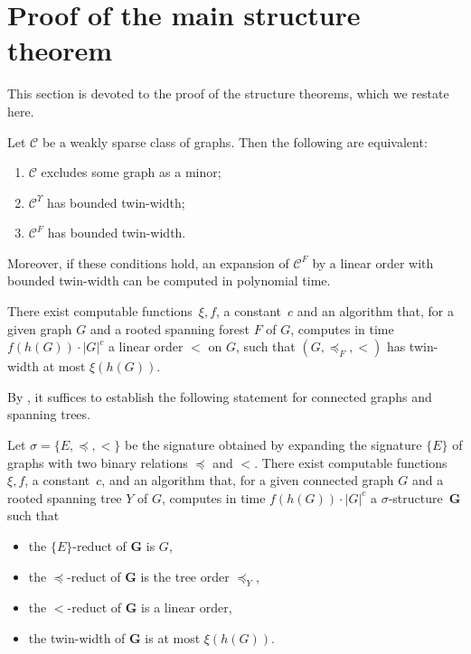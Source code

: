 \documentclass[1p,number,11pt]{elsarticle}
\theoremstyle{plain}
\newcommand{\Cc}{\mathscr{C}}
\begin{document}
\section{Proof of the main structure theorem}\label{sec:proof-main-thm}

This section is devoted to the proof of the structure theorems, which we restate here. 
\begin{theorem}[store=thm-main-structure,restate-keys={note=see \zcpageref[nocap]{thm-main-structure}}]
Let $\Cc$ be a weakly sparse class of graphs. Then the following are equivalent:
\begin{enumerate}[nosep]
    \item $\Cc$ excludes some graph as a minor;
    \item $\Cc^\Upsilon$ has bounded twin-width;
    \item $\Cc^F$ has bounded twin-width.
\end{enumerate}
\medskip 

Moreover, if these conditions hold, an expansion of $\Cc^F$ by a linear order with bounded twin-width can be computed in polynomial time. 
\end{theorem}

\begin{theorem}[store=thm-main-algo,restate-keys={note=see \zcpageref[nocap]{thm-main-algo}}]
There exist computable functions~$\xi,f$, a constant~$c$ and an algorithm that, for a given graph $G$ and a rooted spanning forest $F$ of $G$, computes in time $f(h(G))\cdot|G|^c$ a linear order $<$ on $G$, such that $(G,\preceq_F,<)$  has twin-width  at most $\xi(h(G))$.
\end{theorem}

By , it suffices to establish the following statement for connected graphs and spanning trees.

\begin{theorem}[store=thm-aux-structure,restate-keys={note=see \zcpageref[nocap]{thm-aux-structure}}]
Let $\sigma=\{E,\preceq,<\}$ be the signature obtained by expanding the signature $\{E\}$ of graphs with  two binary relations $\preceq$ and $<$.
There exist computable functions~$\xi,f$, a constant~$c$, and an algorithm that, for a given connected graph $G$ and a rooted spanning tree $Y$ of $G$, computes in time $f(h(G))\cdot|G|^c$ a $\sigma$-structure~$\mathbf G$ such that 
\begin{itemize}[nosep]
    \item the $\{E\}$-reduct of $\mathbf G$ is $G$,
    \item the $\preceq$-reduct of $\mathbf G$ is the tree order $\preceq_Y$,
    \item the $<$-reduct of $\mathbf G$ is a linear order,
    \item the twin-width of $\mathbf G$ is at most $\xi(h(G))$.
\end{itemize}
\end{theorem}
\end{document}
